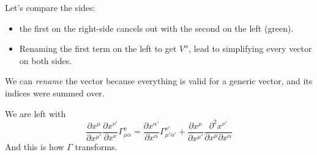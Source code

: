 Let's compare the sides:
\begin{itemize}
\item the first on the right-side cancels out with the second on the left (green).
\item Renaming the first term on the left to get $V^{\alpha }$, lead to simplifying every vector on both sides.
\end{itemize}
We can \emph{rename} the vector because everything is valid for a generic vector, and its indices were summed over.\par
We are left with
\[
\frac{\partial x^{\mu }}{\partial x^{\mu '}}  \frac{\partial x^{\nu '}}{\partial x^{\nu }} \Gamma ^{\nu }_{\mu \alpha } = \frac{\partial x^{\alpha' }}{\partial x^{\alpha }} \Gamma ^{\nu '}_{\mu '\alpha '} + \frac{\partial x^{\mu }}{\partial x^{\mu '}} \frac{\partial ^{2}x^{\nu '}}{\partial x^{\mu }\partial x^{\alpha }} 
\]
And this is how $\Gamma $ transforms.\par

